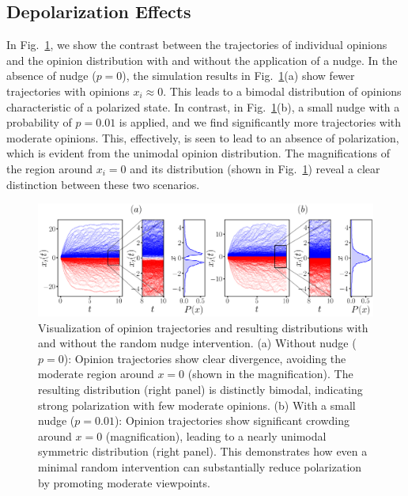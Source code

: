 \subsection{Depolarization Effects}
In Fig.~\ref{fig:trajectory}, we show the contrast between the trajectories of individual opinions and the opinion distribution with and without the application of a nudge. In the absence of nudge ($p=0$), the simulation results in Fig.~\ref{fig:trajectory}(a) show fewer trajectories with opinions $x_i \approx 0$. This leads to a bimodal distribution of opinions characteristic of a polarized state. In contrast, in Fig.~\ref{fig:trajectory}(b), a small nudge with a probability of $p = 0.01$ is applied, and we find significantly more trajectories with moderate opinions. This, effectively, is seen to lead to an absence of polarization, which is evident from the unimodal opinion distribution. The magnifications of the region around $x_i=0$ and its distribution (shown in Fig.~\ref{fig:trajectory}) reveal a clear distinction between these two scenarios.
\begin{figure}[H]
    \centering
    \includegraphics[width=\textwidth]{chapters/chapter2/polarized_and_depolarized_trajectories.pdf}
    \caption{Visualization of opinion trajectories and resulting distributions with and without the random nudge intervention. (a) Without nudge ($p=0$): Opinion trajectories show clear divergence, avoiding the moderate region around $x=0$ (shown in the magnification). The resulting distribution (right panel) is distinctly bimodal, indicating strong polarization with few moderate opinions. (b) With a small nudge ($p=0.01$): Opinion trajectories show significant crowding around $x=0$ (magnification), leading to a nearly unimodal symmetric distribution (right panel). This demonstrates how even a minimal random intervention can substantially reduce polarization by promoting moderate viewpoints.}
    \label{fig:trajectory}
\end{figure}
